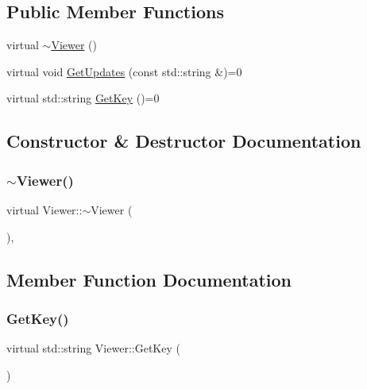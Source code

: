 \subsection*{Public Member Functions}
\begin{DoxyCompactItemize}
\item 
virtual \mbox{\hyperlink{class_viewer_aeeefee5e2503be10272b07f812138f32}{$\sim$\+Viewer}} ()
\item 
virtual void \mbox{\hyperlink{class_viewer_afc23a6059e52f018df843de22b641d83}{Get\+Updates}} (const std\+::string \&)=0
\item 
virtual std\+::string \mbox{\hyperlink{class_viewer_a9937df0f2be6a32f2d756605dc239d1d}{Get\+Key}} ()=0
\end{DoxyCompactItemize}


\subsection{Constructor \& Destructor Documentation}
\mbox{\label{class_viewer_aeeefee5e2503be10272b07f812138f32}} 
\subsubsection{\texorpdfstring{$\sim$Viewer()}{~Viewer()}}
{\footnotesize\ttfamily virtual Viewer\+::$\sim$\+Viewer (\begin{DoxyParamCaption}{ }\end{DoxyParamCaption})\hspace{0.3cm}{\ttfamily [inline]}, {\ttfamily [virtual]}}



\subsection{Member Function Documentation}
\mbox{\label{class_viewer_a9937df0f2be6a32f2d756605dc239d1d}} 
\subsubsection{\texorpdfstring{GetKey()}{GetKey()}}
{\footnotesize\ttfamily virtual std\+::string Viewer\+::\+Get\+Key (\begin{DoxyParamCaption}{ }\end{DoxyParamCaption})\hspace{0.3cm}{\ttfamily [pure virtual]}}



